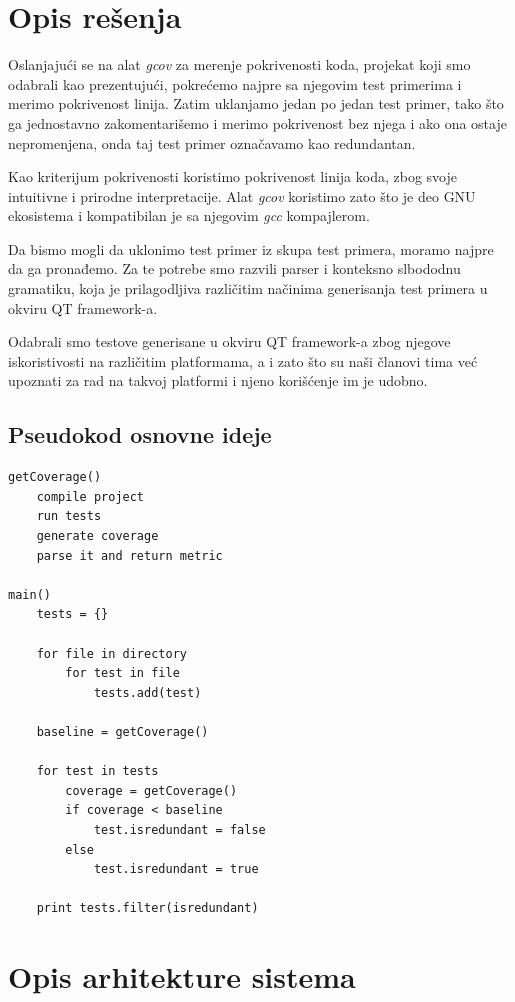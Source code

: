 \documentclass[a4paper]{article}
\begin{document}
\section{Opis rešenja}
\label{sec:opis_resenja}

Oslanjajući se na alat \textit{gcov} za merenje pokrivenosti koda, projekat koji smo odabrali kao prezentujući, pokrećemo najpre sa njegovim test primerima i merimo pokrivenost linija. Zatim uklanjamo jedan po jedan test primer, tako što ga jednostavno zakomentarišemo i merimo pokrivenost bez njega i ako ona ostaje nepromenjena, onda taj test primer označavamo kao redundantan.

Kao kriterijum pokrivenosti koristimo pokrivenost linija koda, zbog svoje intuitivne i prirodne interpretacije. Alat \textit{gcov} koristimo zato što je deo GNU ekosistema i kompatibilan je sa njegovim \textit{gcc} kompajlerom.

Da bismo mogli da uklonimo test primer iz skupa test primera, moramo najpre da ga pronađemo. Za te potrebe smo razvili parser i konteksno slbododnu gramatiku, koja je prilagodljiva različitim načinima generisanja test primera u okviru QT framework-a.

Odabrali smo testove generisane u okviru QT framework-a zbog njegove iskoristivosti na različitim platformama, a i zato što su naši članovi tima već upoznati za rad na takvoj platformi i njeno korišćenje im je udobno.

\subsection{Pseudokod osnovne ideje}
\label{subsec:pseudokod}
\begin{lstlisting}
getCoverage()
    compile project
    run tests
    generate coverage
    parse it and return metric
    
main()
    tests = {}
    
    for file in directory
        for test in file
            tests.add(test)
            
    baseline = getCoverage()
    
    for test in tests
        coverage = getCoverage()
        if coverage < baseline
            test.isredundant = false
        else
            test.isredundant = true
            
    print tests.filter(isredundant)
\end{lstlisting}

\section{Opis arhitekture sistema}
\label{sec:arhitektura}
\end{document}
